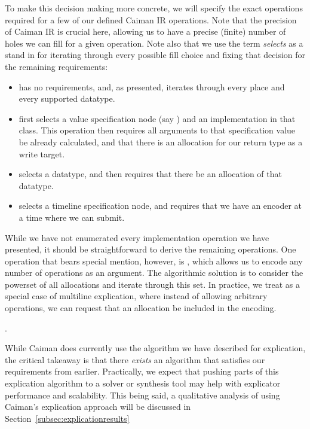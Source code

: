 To make this decision making more concrete, we will specify the exact operations required for a few of our defined Caiman IR operations.  Note that the precision of Caiman IR is crucial here, allowing us to have a precise (finite) number of holes we can fill for a given operation.  Note also that we use the term \emph{selects} as a stand in for iterating through every possible fill choice and fixing that decision for the remaining requirements:
\begin{itemize}
\item {} has no requirements, and, as presented, iterates through every place and every supported datatype.
\item {} first selects a value specification node (say ) and an implementation in that class.  This operation then requires all arguments to that specification value be already calculated, and that there is an allocation for our return type as a write target.
\item {} selects a datatype, and then requires that there be an allocation of that datatype.
\item {} selects a timeline specification node, and requires that we have an encoder at a time where we can submit.
\end{itemize}
While we have not enumerated every implementation operation we have presented, it should be straightforward to derive the remaining operations.  One operation that bears special mention, however, is , which allows us to encode any number of operations as an argument.  The algorithmic solution is to consider the powerset of all allocations and iterate through this set.  In practice, we treat  as a special case of multiline explication, where instead of allowing arbitrary operations, we can request that an allocation be included in the encoding.

.

While Caiman does currently use the algorithm we have described for explication, the critical takeaway is that there \emph{exists} an algorithm that satisfies our requirements from earlier.  Practically, we expect that pushing parts of this explication algorithm to a solver or synthesis tool may help with explicator performance and scalability.  This being said, a qualitative analysis of using Caiman's explication approach will be discussed in Section~\ref{subsec:explicationresults}

